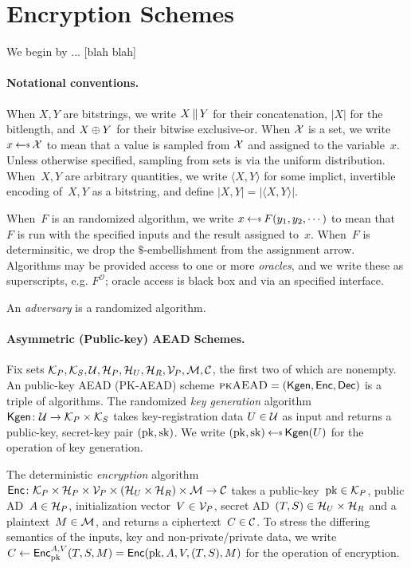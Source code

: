 \section{Encryption Schemes}
\label{sec:prelims}
\label{sec:encryption}
We begin by ... [blah blah]

\paragraph{Notational conventions. }When $X,Y$ are bitstrings, we write $X \,\|\, Y$ for their concatenation, $|X|$ for the bitlength, and $X\oplus Y$ for their bitwise exclusive-or.  When $\mathcal{X}$ is a set, we write $x \getsr \calX$ to mean that a value is sampled from $\mathcal{X}$ and assigned to the variable~$x$.  Unless otherwise specified, sampling from sets is via the uniform distribution.  When~$X,Y$ are arbitrary quantities, we write $\langle X,Y \rangle$ for some implict, invertible encoding of~$X,Y$ as a bitstring, and define $|X,Y|=|\langle X,Y\rangle|$.

When~$F$ is an randomized algorithm, we write $x \getsr F(y_1,y_2,\cdots)$ to mean that~$F$ is run with the specified inputs and the result assigned to~$x$.  When~$F$ is determinsitic, we drop the $\$$-embellishment from the assignment arrow.  Algorithms may be provided access to one or more \emph{oracles}, and we write these as superscripts, e.g. $F^{\mathcal{O}}$; oracle access is black box and via an specified interface.  

An \emph{adversary} is a randomized algorithm.

\paragraph{Asymmetric (Public-key) AEAD Schemes. }
Fix sets $\mathcal{K}_P, \mathcal{K}_S, \mathcal{U}, \mathcal{H}_P, \mathcal{H}_U, \mathcal{H}_R, \mathcal{V}_P, \mathcal{M},
\mathcal{C}$, the first two of which are nonempty.  An public-key AEAD
(PK-AEAD) scheme $\textsc{pkAEAD}=(\mathsf{Kgen},{\mathsf{Enc}},{\mathsf{Dec}})$ is a triple of algorithms.  The randomized \emph{key generation} algorithm~$\mathsf{Kgen}\colon\mathcal{U}\to\mathcal{K}_P\times\mathcal{K}_S$ takes key-registration data $U \in \mathcal{U}$ as input and returns a public-key, secret-key pair $(\mathrm{pk},\mathrm{sk})$.  We write $(\pk,\sk)\getsr\Kgen(\kreg)$ for the operation of key generation. 

The deterministic \emph{encryption} algorithm ${\mathsf{Enc}} \colon \mathcal{K}_P \times \mathcal{H}_P \times \mathcal{V}_P \times \left(\mathcal{H}_U \times \mathcal{H}_R\right) \times \mathcal{M} \to \mathcal{C}$ takes a public-key~$\mathrm{pk}\in\mathcal{K}_P$, public AD~$A \in \mathcal{H}_P$, initialization vector~$V \in \mathcal{V}_P$, secret AD~$(T,S) \in \mathcal{H}_U \times \mathcal{H}_R$ and a plaintext~$M \in \mathcal{M}$, and returns a ciphertext~$C \in \mathcal{C}$. 
To stress the differing semantics of the inputs, key and non-private/private data, we write $C\gets{\mathsf{Enc}}_{\mathrm{pk}}^{A,V}(T,S,M) ={\mathsf{Enc}}(\mathrm{pk},A,V,(T,S),M)$ for the operation of encryption.  %


